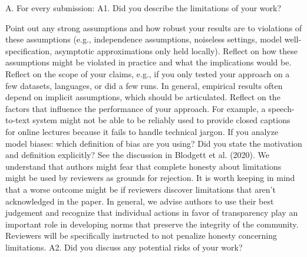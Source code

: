 
A. For every submission:
A1. Did you describe the limitations of your work?

Point out any strong assumptions and how robust your results are to violations of these assumptions (e.g., independence assumptions, noiseless settings, model well-specification, asymptotic approximations only held locally). Reflect on how these assumptions might be violated in practice and what the implications would be.
Reflect on the scope of your claims, e.g., if you only tested your approach on a few datasets, languages, or did a few runs. In general, empirical results often depend on implicit assumptions, which should be articulated. Reflect on the factors that influence the performance of your approach. For example, a speech-to-text system might not be able to be reliably used to provide closed captions for online lectures because it fails to handle technical jargon.
If you analyze model biases: which definition of bias are you using? Did you state the motivation and definition explicitly? See the discussion in Blodgett et al. (2020).
We understand that authors might fear that complete honesty about limitations might be used by reviewers as grounds for rejection. It is worth keeping in mind that a worse outcome might be if reviewers discover limitations that aren’t acknowledged in the paper. In general, we advise authors to use their best judgement and recognize that individual actions in favor of transparency play an important role in developing norms that preserve the integrity of the community. Reviewers will be specifically instructed to not penalize honesty concerning limitations.
A2. Did you discuss any potential risks of your work?

